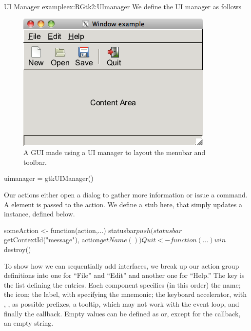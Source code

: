 \begin{example}{UI Manager example}{ex:RGtk2:UImanager}
We define the UI manager as follows

\begin{figure}
  \centering
  \includegraphics[width=.6\textwidth]{ex-RGtk2-UI}
  \caption{A GUI made using a UI manager to layout the menubar and toolbar.}
  \label{fig:RGtk2-UI}
\end{figure}


\begin{Schunk}
\begin{Sinput}
 uimanager = gtkUIManager()
\end{Sinput}
\end{Schunk}

Our actions either open a dialog to gather more information or issue a
command. A  element is passed to the action. We
define a stub here, that simply updates a 
instance, defined below.
\begin{Schunk}
\begin{Sinput}
 someAction <- function(action,...) 
   statusbar$push(statusbar$getContextId("message"), action$getName())
 Quit <- function(...) win$destroy()
\end{Sinput}
\end{Schunk}

To show how we can sequentially add interfaces, we break up our action
group definitions into one for ``File'' and ``Edit'' and another one
for ``Help.'' The key is the list defining the entries. Each component
specifies (in this order) the name; the icon; the label, with
\code{\_} specifying the mnemonic; the keyboard accelerator, with
, ,  as possible prefixes, a
tooltip, which may not work with the \R\/ event loop, and finally the
callback. Empty values can be defined as  or, except for
the callback, an empty string.



\end{example}
